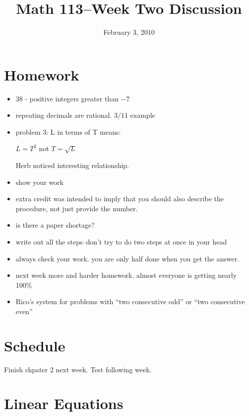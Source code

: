 \documentclass[fleqn]{article}
\title{Math 113--Week Two Discussion}
\author{}
\date{February 3, 2010}
\begin{document}
\maketitle

\section{Homework}

\begin{itemize}
\item 38 - positive integers greater than $-7$

\item repeating decimals are rational.  $3/11$ example

\item problem 3: L in terms of T means:

\(L = T^2\) not \(T = \sqrt{L}\)

Herb noticed interesting relationship.

\vspace{3 in}

\item show your work

\item extra credit was intended to imply that you should also describe the procedure, not just provide the number.

\item is there a paper shortage?

\item write out all the steps--don't try to do two steps at once in your head

\item always check your work.  you are only half done when you get the answer.

\item next week more and harder homework.  almost everyone is getting nearly 100\%

\item Rico's system for problems with ``two consecutive odd'' or ``two consecutive even''

\end{itemize}

\section{Schedule}

Finish chpater 2 next week.  Test following week.

\section{Linear Equations}
\end{document}
